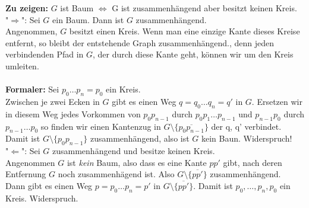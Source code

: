 \begin{problem*}[4]
\textbf{Zu zeigen:} $ G $ ist Baum $ \Longleftrightarrow $ G ist zusammenhängend aber besitzt keinen Kreis.\\
"$\Rightarrow$": Sei $ G $ ein Baum. Dann ist $ G $ zusammenhängend.\\
Angenommen, $ G $ besitzt einen Kreis. Wenn man eine einzige Kante dieses Kreise entfernt, so bleibt der entstehende Graph zusammenhängend., denn jeden verbindenden Pfad in $ G $, der durch diese Kante geht, können wir um den Kreis umleiten.\\ 
\\
\textbf{Formaler:} Sei $p_0 \dots p_n = p_0$ ein Kreis.\\
Zwischen je zwei Ecken in $ G $ gibt es einen Weg $q = q_0 \dots q_n = q' $ in $ G $. Ersetzen wir in diesem Weg jedes Vorkommen von $ p_0p_{ n-1 } $ durch $p_0p_1 \dots p_{ n-1 }$ und $p_{ n-1 }p_0$ durch $p_{ n-1 } \dots p_0$ so finden wir einen Kantenzug in $ G \setminus \{ \overline{ p_0p_{ n-1 } } \}$ der q, q' verbindet.\\
Damit ist $ G \setminus \{ p_0p_{ n-1 } \}$ zusammenhängend, also ist $ G $ kein Baun. Widerspruch!\\
"$\Leftarrow$": Sei $ G $ zusammenhängend und besitze keinen Kreis. \\
Angenommen $ G $ ist \emph{kein} Baum, also dass es eine Kante $ pp' $ gibt, nach deren Entfernung $ G $ noch zusammenhägend ist. Also $ G \setminus \{ \overline{pp'} \}$ zusammenhängend. \\
Dann gibt es einen Weg $p = p_0 \dots p_n = p'$ in $ G \setminus \{ \overline{pp'} \}$. Damit ist $p_0, \dots, p_n, p_0$ ein Kreis. Widerspruch.

\end{problem*}















